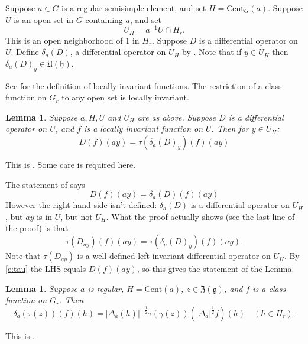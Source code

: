 \documentclass{article}
\newtheorem{lem}[thm]{Lemma}
\theoremstyle{definition}
\numberwithin{equation}{section}
\renewcommand{\-}{\hyp{}}
\newcommand{\inv}{^{-1}}
\newcommand{\z}{\mathfrak Z}
\newcommand{\U}{\mathfrak U}
\newcommand{\g}{\mathfrak g}
\newcommand{\h}{\mathfrak h}
\newcommand{\Cent}{\mathrm{Cent}}
\begin{document}
Suppose $a\in G$ is a regular semisimple element, and set $H=\Cent_G(a)$. Suppose $U$ is an open set in $G$ containing $a$, 
and set
\begin{equation}
  \label{e:UH}
U_H=a\inv U\cap H_r.
\end{equation}
This is an open neighborhood of $1$ in $H_r$.
Suppose $D$ is a differential operator on $U$. Define $\delta_a(D)$, a differential operator  on $U_H$ by \cite[Section 4]{HC_inv_eigen}.
Note that if $y\in U_H$ then $\delta_a(D)_y\in \U(\h)$. 

See \cite[Section 8]{HC_inv_dist} for the definition of locally invariant functions.
The restriction of a class function on $G_r$ to any open set is locally invariant.

\begin{lem}
\label{l:1}
Suppose $a,H,U$ and $U_H$ are as above. 
Suppose $D$ is a differential operator on $U$, and $f$ is a locally invariant function on $U$.
Then for $y\in U_H$:
$$
D(f)(ay)=\tau(\delta_a(D)_y)(f)(ay)
$$
\end{lem}

This is \cite[Lemma 18]{HC_inv_eigen}. Some care is required here.

The statement of \cite[Lemma 18]{HC_inv_eigen} says
$$
D(f)(ay)=\delta_a(D)(f)(ay)
$$
However the right hand side isn't defined: $\delta_a(D)$ is a differential operator on $U_H$, but $ay$ is in $U$, but not $U_H$.
What the proof actually shows (see the last line of the proof) is that 
$$
\tau(D_{ay})(f)(ay)=\tau(\delta_a(D)_y)(f)(ay).
$$
Note that $\tau(D_{ay})$ is a well defined left-invariant differential operator on $U_H$.
By \eqref{e:tau}
the LHS equals $D(f)(ay)$, so this gives the statement of the Lemma.

\begin{lem}
\label{l:2}
Suppose $a$ is regular, $H=\Cent(a)$, $z\in \z(\g)$, and $f$ is a class function  
on $G_r$. Then 
$$
\delta_a(\tau(z))(f)(h)=|\Delta_a(h)|^{-\frac12}\tau(\gamma(z))(|\Delta_a|^{\frac12}f)(h)\quad(h\in H_r).
$$
\end{lem}

This is \cite[Lemma 13]{HC_inv_eigen}.
\end{document}
